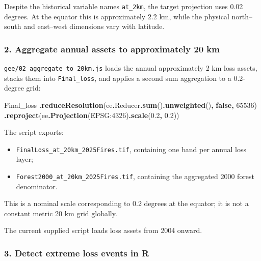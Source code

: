\documentclass[
]{article}
\newenvironment{Shaded}{\begin{snugshade}}{\end{snugshade}}
\newcommand{\AttributeTok}[1]{\textcolor[rgb]{0.13,0.29,0.53}{#1}}
\newcommand{\DecValTok}[1]{\textcolor[rgb]{0.00,0.00,0.81}{#1}}
\newcommand{\FloatTok}[1]{\textcolor[rgb]{0.00,0.00,0.81}{#1}}
\newcommand{\FunctionTok}[1]{\textcolor[rgb]{0.13,0.29,0.53}{\textbf{#1}}}
\newcommand{\KeywordTok}[1]{\textcolor[rgb]{0.13,0.29,0.53}{\textbf{#1}}}
\newcommand{\NormalTok}[1]{#1}
\newcommand{\OperatorTok}[1]{\textcolor[rgb]{0.81,0.36,0.00}{\textbf{#1}}}
\newcommand{\StringTok}[1]{\textcolor[rgb]{0.31,0.60,0.02}{#1}}
\providecommand{\tightlist}{%
  \setlength{\itemsep}{0pt}\setlength{\parskip}{0pt}}
\begin{document}
Despite the historical variable names \texttt{at\_2km}, the target
projection uses 0.02 degrees. At the equator this is approximately 2.2
km, while the physical north--south and east--west dimensions vary with
latitude.

\subsubsection{2. Aggregate annual assets to approximately 20
km}\label{aggregate-annual-assets-to-approximately-20-km}

\texttt{gee/02\_aggregate\_to\_20km.js} loads the annual approximately 2
km loss assets, stacks them into \texttt{Final\_loss}, and applies a
second sum aggregation to a 0.2-degree grid:

\begin{Shaded}
\begin{Highlighting}[]
\NormalTok{Final\_loss}
  \OperatorTok{.}\FunctionTok{reduceResolution}\NormalTok{(ee}\OperatorTok{.}\AttributeTok{Reducer}\OperatorTok{.}\FunctionTok{sum}\NormalTok{()}\OperatorTok{.}\FunctionTok{unweighted}\NormalTok{()}\OperatorTok{,} \KeywordTok{false}\OperatorTok{,} \DecValTok{65536}\NormalTok{)}
  \OperatorTok{.}\FunctionTok{reproject}\NormalTok{(ee}\OperatorTok{.}\FunctionTok{Projection}\NormalTok{(}\StringTok{\textquotesingle{}EPSG:4326\textquotesingle{}}\NormalTok{)}\OperatorTok{.}\FunctionTok{scale}\NormalTok{(}\FloatTok{0.2}\OperatorTok{,} \FloatTok{0.2}\NormalTok{))}
\end{Highlighting}
\end{Shaded}

The script exports:

\begin{itemize}
\tightlist
\item
  \texttt{FinalLoss\_at\_20km\_2025Fires.tif}, containing one band per
  annual loss layer;
\item
  \texttt{Forest2000\_at\_20km\_2025Fires.tif}, containing the
  aggregated 2000 forest denominator.
\end{itemize}

This is a nominal scale corresponding to 0.2 degrees at the equator; it
is not a constant metric 20 km grid globally.

The current supplied script loads loss assets from 2004 onward.

\subsubsection{3. Detect extreme loss events in
R}\label{detect-extreme-loss-events-in-r}
\end{document}

